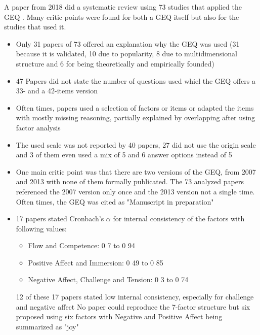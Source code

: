 A paper from 2018 did a systematic review using 73 studies that applied the GEQ \cite{law2018systematic}. Many critic points were found for both a GEQ itself but also for the studies that used it.
\begin{itemize}
	\item Only 31 papers of 73 offered an explanation why the GEQ was used (31 because it is validated, 10 due to popularity, 8 due to multidimensional structure and 6 for being theoretically and empirically founded) 
	\item 47 Papers did not state the number of questions used whiel the GEQ offers a 33- and a 42-items version 
	\item Often times, papers used a selection of factors or items or adapted the items with mostly missing reasoning, partially explained by overlapping after using factor analysis 
	\item The used scale was not reported by 40 papers, 27 did not use the origin scale and 3 of them even used a mix of 5 and 6 answer options instead of 5 
	\item One main critic point was that there are two versions of the GEQ, from 2007 and 2013 with none of them formally publicated. The 73 analyzed papers referenced the 2007 version only once and the 2013 version not a single time. Often times, the GEQ was cited as "Manuscript in preparation" 
	\item 17 papers stated Cronbach's $\alpha$ for internal consistency of the factors with following values:
	\begin{itemize}
		\item Flow and Competence: 0 7 to 0 94
		\item Positive Affect and Immersion: 0 49 to 0 85
		\item Negative Affect, Challenge and Tension: 0 3 to 0 74
	\end{itemize}
12 of these 17 papers stated low internal consistency, especially for challenge and negative affect 
No paper could reproduce the 7-factor structure but six proposed using six factors with Negative and Positive Affect being summarized as "joy" 
\end{itemize}

